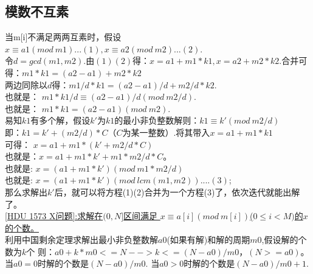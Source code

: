 \subsection{模数不互素}
当m[i]不满足两两互素时，假设$x \equiv a1(mod\ m1)...(1), x \equiv a2(mod\  m2)...(2).$ \\
令$d = gcd(m1, m2)$.由$(1)(2)$得：$x = a1 + m1 * k1, x = a2 + m2 * k2$.合并可得：$m1 * k1 = (a2 - a1) + m2 * k2$ \\
两边同除以$d$得：$m1/d * k1 = (a2 - a1) / d + m2 / d * k2$. \\
也就是： $m1 * k1 / d ≡ (a2 - a1) / d (mod\  m2/d)$. \\
也就是： $m1 * k1 = (a2 - a1) (mod\  m2)$. \\
易知$k1$有多个解，假设$k'$为$k1$的最小非负整数解则：$k1 \equiv k' (mod\  m2/d)$ \\
即：$k1 = k' + (m2 / d) * C$（$C$为某一整数）.将其带入$x = a1 + m1 * k1$ \\
可得：  $x = a1 + m1 * (k' + m2 / d * C)$ \\
也就是：$x = a1 + m1 * k' + m1 * m2 / d * C$。 \\
也就是: $x = (a1 + m1 * k') (mod\  m1 * m2 / d)$ \\
也就是: $x = (a1 + m1 * k') (mod\  lcm(m1, m2))....(3)$; \\
那么求解出$k'$后，就可以将方程(1)(2)合并为一个方程(3)了，依次迭代就能出解了。 \\
\underline{[HDU 1573 X问题]:求解在$(0, N]$区间满足 $x \equiv a[i](mod\  m[i])$($0\leq i < M)$的$x$的个数。} \\

利用中国剩余定理求解出最小非负整数解$a0$(如果有解)和解的周期$m0$,假设解的个数为$k$个 则：$a0 + k * m0 <= N --> k <= (N - a0) / m0，(N >= a0)$。 当$a0 = 0$时解的个数是$(N - a0) / m0$. 当$a0 > 0$时解的个数是$(N - a0) / m0 + 1$.

